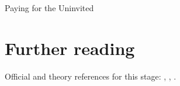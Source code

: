 \begin{ledger}{Paying for the Uninvited}
\end{ledger}

\section{Further reading}
\label{sec:paying_for_uninvited:further_reading}
Official and theory references for this stage: \cite{CMS:2016lmd}, \cite{CMS:2011krm}, \cite{Cacciari:2007fd}.

\begin{pitfalls}
\end{pitfalls}

\begin{exercises}
\item {}
\item {}
\end{exercises}
